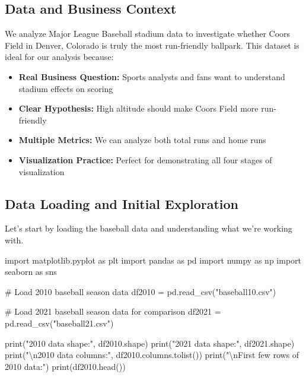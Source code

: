 \documentclass[
  letterpaper,
  DIV=11,
  numbers=noendperiod]{scrartcl}
\newenvironment{Shaded}{\begin{snugshade}}{\end{snugshade}}
\newcommand{\BuiltInTok}[1]{\textcolor[rgb]{0.00,0.23,0.31}{#1}}
\newcommand{\CharTok}[1]{\textcolor[rgb]{0.13,0.47,0.30}{#1}}
\newcommand{\CommentTok}[1]{\textcolor[rgb]{0.37,0.37,0.37}{#1}}
\newcommand{\ImportTok}[1]{\textcolor[rgb]{0.00,0.46,0.62}{#1}}
\newcommand{\NormalTok}[1]{\textcolor[rgb]{0.00,0.23,0.31}{#1}}
\newcommand{\OperatorTok}[1]{\textcolor[rgb]{0.37,0.37,0.37}{#1}}
\newcommand{\StringTok}[1]{\textcolor[rgb]{0.13,0.47,0.30}{#1}}
\providecommand{\tightlist}{%
  \setlength{\itemsep}{0pt}\setlength{\parskip}{0pt}}
\begin{document}
\subsection{Data and Business Context}\label{data-and-business-context}

We analyze Major League Baseball stadium data to investigate whether
Coors Field in Denver, Colorado is truly the most run-friendly ballpark.
This dataset is ideal for our analysis because:

\begin{itemize}
\tightlist
\item
  \textbf{Real Business Question:} Sports analysts and fans want to
  understand stadium effects on scoring
\item
  \textbf{Clear Hypothesis:} High altitude should make Coors Field more
  run-friendly
\item
  \textbf{Multiple Metrics:} We can analyze both total runs and home
  runs
\item
  \textbf{Visualization Practice:} Perfect for demonstrating all four
  stages of visualization
\end{itemize}

\subsection{Data Loading and Initial
Exploration}\label{data-loading-and-initial-exploration}

Let's start by loading the baseball data and understanding what we're
working with.

\label{load-data}
\begin{Shaded}
\begin{Highlighting}[]
\ImportTok{import}\NormalTok{ matplotlib.pyplot }\ImportTok{as}\NormalTok{ plt}
\ImportTok{import}\NormalTok{ pandas }\ImportTok{as}\NormalTok{ pd}
\ImportTok{import}\NormalTok{ numpy }\ImportTok{as}\NormalTok{ np}
\ImportTok{import}\NormalTok{ seaborn }\ImportTok{as}\NormalTok{ sns}

\CommentTok{\# Load 2010 baseball season data}
\NormalTok{df2010 }\OperatorTok{=}\NormalTok{ pd.read\_csv(}\StringTok{"baseball10.csv"}\NormalTok{)}

\CommentTok{\# Load 2021 baseball season data for comparison}
\NormalTok{df2021 }\OperatorTok{=}\NormalTok{ pd.read\_csv(}\StringTok{"baseball21.csv"}\NormalTok{)}

\BuiltInTok{print}\NormalTok{(}\StringTok{"2010 data shape:"}\NormalTok{, df2010.shape)}
\BuiltInTok{print}\NormalTok{(}\StringTok{"2021 data shape:"}\NormalTok{, df2021.shape)}
\BuiltInTok{print}\NormalTok{(}\StringTok{"}\CharTok{\textbackslash{}n}\StringTok{2010 data columns:"}\NormalTok{, df2010.columns.tolist())}
\BuiltInTok{print}\NormalTok{(}\StringTok{"}\CharTok{\textbackslash{}n}\StringTok{First few rows of 2010 data:"}\NormalTok{)}
\BuiltInTok{print}\NormalTok{(df2010.head())}
\end{Highlighting}
\end{Shaded}
\end{document}
